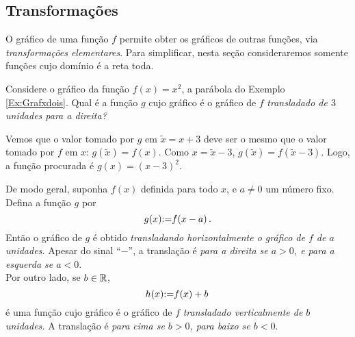 \subsection{Transformações}
O gráfico de uma função $f$ permite obter os gráficos de outras funções, via
\emph{transformações elementares}.
Para simplificar, nesta seção consideraremos somente funções cujo domínio é a reta toda.
\begin{ex}
Considere o gráfico da função $f(x)=x^2$, a parábola do Exemplo \ref{Ex:Grafxdois}. Qual é a 
função ${g}$ cujo gráfico é o gráfico de $f$ 
\emph{transladado de $3$ unidades para a direita?}
\begin{center}
\begin{bmlimage}\end{bmlimage}
\end{center}
 Vemos que o valor tomado por ${{g}}$ em $\tilde{x}=x+3$ deve ser o mesmo que o valor tomado por
$f$ em $x$: ${{g}}(\tilde{x})=f(x)$. Como $x=\tilde{x}-3$, ${{g}}(\tilde{x})=f(\tilde{x}-3)$. Logo, a função procurada
é ${{g}}(x)=(x-3)^2$.
\end{ex}

 De modo geral, suponha $f(x)$ definida para todo $x$, e $a\neq 0$ um número fixo. Defina
a função $g$ por
$$g(x){:=} f(x-a)\,.$$
 Então o gráfico de $g$ é obtido \emph{transladando horizontalmente o gráfico de $f$ de
$a$ unidades.} Apesar do sinal ``$-$'', 
a translação é \emph{para a direita se $a>0$, e para a esquerda se $a<0$}.\\

Por outro lado, se $b\in \mathbb{R}$, 
$$h(x){:=} f(x)+b\,$$
é uma função cujo gráfico é o gráfico de $f$ \emph{transladado verticalmente de $b$
unidades.} A translação é \emph{para cima se $b>0$, para baixo
se $b<0$}.

